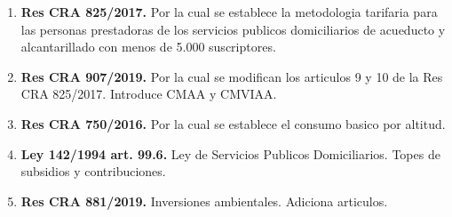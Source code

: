 \documentclass[11pt,a4paper,oneside]{report}
\begin{document}
\begin{enumerate}[leftmargin=*]
    \item \textbf{Res CRA 825/2017.} Por la cual se establece la metodologia tarifaria para las personas prestadoras de los servicios publicos domiciliarios de acueducto y alcantarillado con menos de 5.000 suscriptores.
    \item \textbf{Res CRA 907/2019.} Por la cual se modifican los articulos 9 y 10 de la Res CRA 825/2017. Introduce CMAA y CMVIAA.
    \item \textbf{Res CRA 750/2016.} Por la cual se establece el consumo basico por altitud.
    \item \textbf{Ley 142/1994 art. 99.6.} Ley de Servicios Publicos Domiciliarios. Topes de subsidios y contribuciones.
    \item \textbf{Res CRA 881/2019.} Inversiones ambientales. Adiciona articulos.
\end{enumerate}
\end{document}
